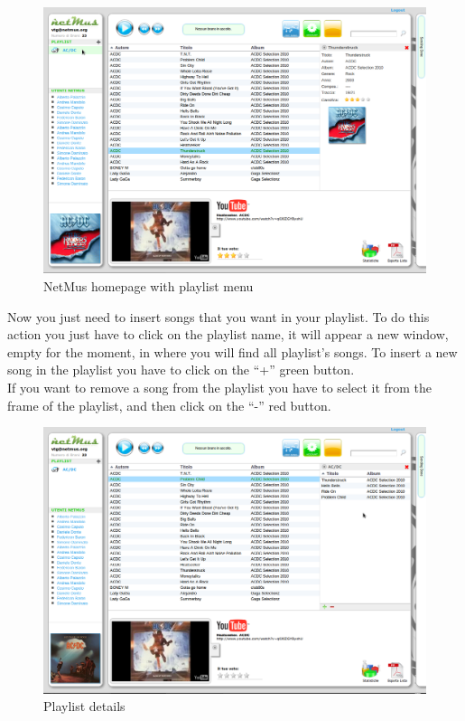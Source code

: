 \begin{figure}[htbp]
  \centering
  \includegraphics[width=15cm]{img/MU/new_playlist.png}
\caption{NetMus homepage with playlist menu}
\end{figure}

Now you just need to insert songs that you want in your playlist. To do this
action you just have to click on the playlist name, it will appear a new window,
empty for the moment, in where you will find all playlist's songs. To insert a
new song in the playlist you have to click on the ``+'' green button.\\
If you want to remove a song from the playlist you have to select it from the
frame of the playlist, and then click on the ``-''
red button.\\

\begin{figure}[htbp]
  \centering
  \includegraphics[width=15cm]{img/MU/playlist_song.png}
\caption{Playlist details}
\end{figure}


